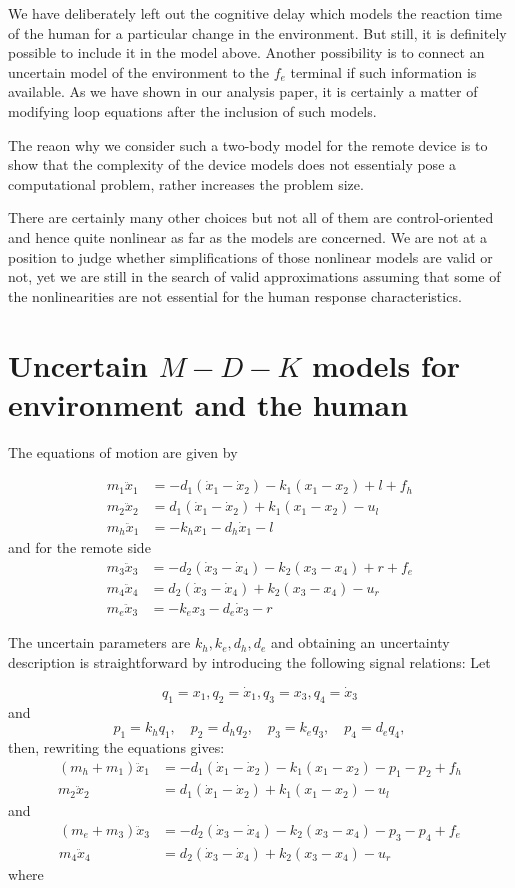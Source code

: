 We have deliberately left out the cognitive delay which models the reaction time of the human for a particular
change in the environment. But still, it is definitely possible to include it in the model above. Another 
possibility is to connect an uncertain model of the environment to the $f_e$ terminal if such information 
is available. As we have shown in our analysis paper, it is certainly a matter of modifying loop equations
after the inclusion of such models. 

The reaon why we consider such a two-body model for the remote device is to show that the complexity of the 
device models does not essentialy pose a computational problem, rather increases the problem size. 

There are certainly many other choices but not all of them are control-oriented and hence quite nonlinear
as far as the models are concerned. We are not at a position to judge whether simplifications of those 
nonlinear models are valid or not, yet we are still in the search of valid approximations assuming that
some of the nonlinearities are not essential for the human response characteristics.

\section{Uncertain $M-D-K$ models for environment and the human}

The equations of motion are given by 

\begin{align}
	m_1\ddot x_1 &= -d_1(\dot{x}_1-\dot{x}_2) - k_1(x_1-x_2) + l + f_h\\
	m_2\ddot x_2 &= d_1(\dot{x}_1-\dot{x}_2) + k_1(x_1-x_2) - u_l\\	
	m_h\ddot x_1 & = -k_hx_1 - d_h \dot{x}_1 - l
\end{align}
and for the remote side
\begin{align}
	m_3\ddot x_3 &= -d_2(\dot{x}_3-\dot{x}_4) - k_2(x_3-x_4) + r + f_e\\
	m_4\ddot x_4 &= d_2(\dot{x}_3-\dot{x}_4) + k_2(x_3-x_4) - u_r\\	
	m_e\ddot x_3 & = -k_ex_3 - d_e \dot{x}_3 - r
\end{align}

The uncertain parameters are $k_h,k_e,d_h,d_e$ and obtaining an uncertainty description is straightforward by introducing 
the following signal relations: Let 

\[
	q_1 = x_1, q_2 = \dot{x}_1, q_3 = x_3, q_4 = \dot{x}_3
\]
and 
\[
  p_1 = k_h q_1,\quad p_2 = d_hq_2,\quad p_3 = k_e q_3,\quad p_4 = d_e q_4,
\]
then, rewriting the equations gives:
\begin{align}
	(m_h+m_1)\ddot x_1 &= -d_1(\dot{x}_1-\dot{x}_2) - k_1(x_1-x_2) -p_1 -p_2 + f_h\\
	m_2\ddot x_2 &= d_1(\dot{x}_1-\dot{x}_2) + k_1(x_1-x_2) - u_l	
\end{align}
and 
\begin{align}
	(m_e+m_3)\ddot x_3 &= -d_2(\dot{x}_3-\dot{x}_4) - k_2(x_3-x_4) -p_3 - p_4+f_e\\
	m_4\ddot x_4 &= d_2(\dot{x}_3-\dot{x}_4) + k_2(x_3-x_4) - u_r
\end{align}
where 


